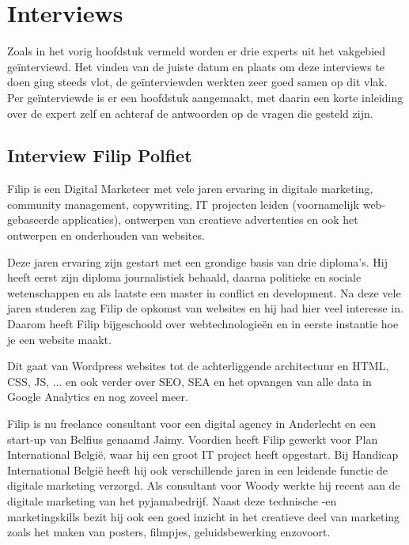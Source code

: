 
\chapter{Interviews}
\label{ch:interviews}

Zoals in het vorig hoofdstuk vermeld worden er drie experts uit het vakgebied geïnterviewd. Het vinden van de juiste datum en plaats om deze interviews te doen ging steeds vlot, de geïnterviewden werkten zeer goed samen op dit vlak. Per geïnterviewde is er een hoofdstuk aangemaakt, met daarin een korte inleiding over de expert zelf en achteraf de antwoorden op de vragen die gesteld zijn.

\section{Interview Filip Polfiet}
\label{sec:interview-filip}

Filip is een Digital Marketeer met vele jaren ervaring in digitale marketing, community management, copywriting, IT projecten leiden (voornamelijk web-gebaseerde applicaties), ontwerpen van creatieve advertenties en ook het ontwerpen en onderhouden van websites. 

Deze jaren ervaring zijn gestart met een grondige basis van drie diploma's. Hij heeft eerst zijn diploma journalistiek behaald, daarna politieke en sociale wetenschappen en als laatste een master in conflict en development. Na deze vele jaren studeren zag Filip de opkomst van websites en hij had hier veel interesse in. Daarom heeft Filip bijgeschoold over webtechnologieën en in eerste instantie hoe je een website maakt. 

Dit gaat van Wordpress websites tot de achterliggende architectuur en HTML, CSS, JS, ... en ook verder over SEO, SEA en het opvangen van alle data in Google Analytics en nog zoveel meer. 

Filip is nu freelance consultant voor een digital agency in Anderlecht en een start-up van Belfius genaamd Jaimy. Voordien heeft Filip gewerkt voor Plan International België, waar hij een groot IT project heeft opgestart. Bij Handicap International België heeft hij ook verschillende jaren in een leidende functie de digitale marketing verzorgd. Als consultant voor Woody werkte hij recent aan de digitale marketing van het pyjamabedrijf. Naast deze technische -en marketingskills bezit hij ook een goed inzicht in het creatieve deel van marketing zoals het maken van posters, filmpjes, geluidsbewerking enzovoort.

